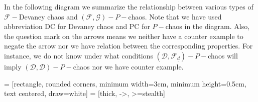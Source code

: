 \documentclass{amsart}[12pt, papera4]
\theoremstyle{definition}
\theoremstyle{remark}
\numberwithin{equation}{section}
\def\F{{\mathscr{F}}}
\def\G{{\mathscr{G}}}
\begin{document}
\smallskip
\noindent In the following diagram we summarize the relationship between various types of $\F-$Devaney chaos and $(\F,\G)-P-$chaos. Note that we have used abbreviation DC for Devaney chaos and PC for $P-$chaos in the diagram. Also, the question mark on the arrows means we neither have a counter example to negate the arrow nor we have relation between the corresponding properties. For instance, we do not know under what conditions  $(\mathscr{D},\F_{\underline{d}})-P-$chaos will imply $(\mathscr{D},\mathscr{D})-P-$chaos nor we have counter example. 

\medskip 

\medskip 

 = [rectangle, rounded corners, minimum width=3cm, minimum height=0.5cm, text centered, draw=white]
 = [thick, ->, >=stealth]
\end{document}

